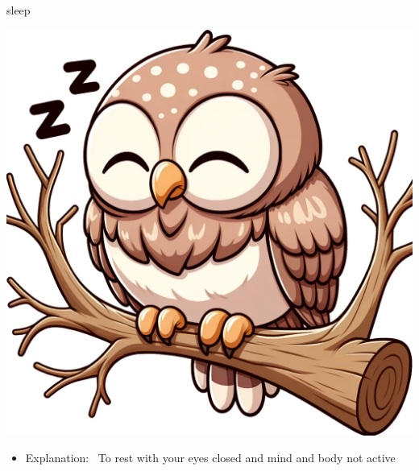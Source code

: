 \documentclass[avery5371, grid,frame]{flashcards}
\begin{document}
\renewcommand{\cardpaper}{a4paper}
\renewcommand{\cardpapermode}{landscape}
\renewcommand{\cardrows}{2}
\renewcommand{\cardcolumns}{2}
\setlength{\cardheight}{3.5in}
\setlength{\cardwidth}{5.0in}
\setlength{\topoffset}{0.65in}
\setlength{\oddoffset}{0.65in}
\setlength{\evenoffset}{0.65in}

\begin{flashcard}{sleep}
    \vspace*{\fill}
    \begin{center}
        \begin{minipage}[c]{.45\textwidth}
            \includegraphics[width=\textwidth]{cards/s/sleep/sleep - an owl perched on a tree branch, head tucked under its wing, snoozing during the day.png}
        \end{minipage}
        \begin{minipage}[c]{.45\textwidth}
            \begin{itemize}\setlength\itemsep{12pt}
            \item Explanation: \ To rest with your eyes closed and mind and body not active


\end{itemize}
\end{minipage}
\end{center}
\end{flashcard}
\end{document}
